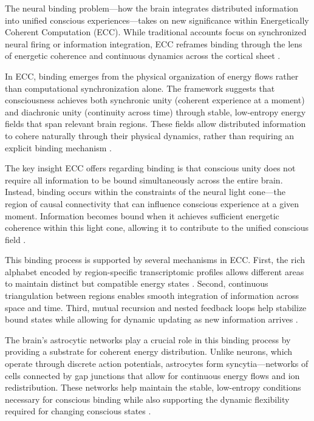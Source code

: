 \begin{refsection}
The neural binding problem—how the brain integrates distributed information into unified conscious experiences—takes on new significance within Energetically Coherent Computation (ECC). While traditional accounts focus on synchronized neural firing or information integration, ECC reframes binding through the lens of energetic coherence and continuous dynamics across the cortical sheet \cite{hardcastle1999binding}.

In ECC, binding emerges from the physical organization of energy flows rather than computational synchronization alone. The framework suggests that consciousness achieves both synchronic unity (coherent experience at a moment) and diachronic unity (continuity across time) through stable, low-entropy energy fields that span relevant brain regions. These fields allow distributed information to cohere naturally through their physical dynamics, rather than requiring an explicit binding mechanism \cite{vondermalsburg1999binding}.

The key insight ECC offers regarding binding is that conscious unity does not require all information to be bound simultaneously across the entire brain. Instead, binding occurs within the constraints of the neural light cone—the region of causal connectivity that can influence conscious experience at a given moment. Information becomes bound when it achieves sufficient energetic coherence within this light cone, allowing it to contribute to the unified conscious field \cite{singer1999neuronal}.

This binding process is supported by several mechanisms in ECC. First, the rich alphabet encoded by region-specific transcriptomic profiles allows different areas to maintain distinct but compatible energy states \cite{kumar2010spiking}. Second, continuous triangulation between regions enables smooth integration of information across space and time. Third, mutual recursion and nested feedback loops help stabilize bound states while allowing for dynamic updating as new information arrives \cite{buzsaki2004neuronal}.

The brain's astrocytic networks play a crucial role in this binding process by providing a substrate for coherent energy distribution. Unlike neurons, which operate through discrete action potentials, astrocytes form syncytia—networks of cells connected by gap junctions that allow for continuous energy flows and ion redistribution. These networks help maintain the stable, low-entropy conditions necessary for conscious binding while also supporting the dynamic flexibility required for changing conscious states \cite{womelsdorf2007modulation}.


\end{refsection}
